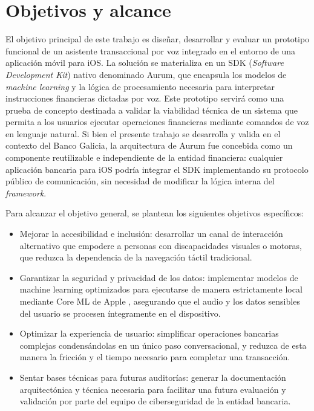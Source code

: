 \section{Objetivos y alcance}


El objetivo principal de este trabajo es diseñar, desarrollar y evaluar un prototipo funcional de un asistente transaccional por voz integrado en el entorno de una aplicación móvil para iOS. La solución se materializa en un SDK (\textit{Software Development Kit}) nativo denominado Aurum, que encapsula los modelos de \textit{machine learning} y la lógica de procesamiento necesaria para interpretar instrucciones financieras dictadas por voz. Este prototipo servirá como una prueba de concepto destinada a validar la viabilidad técnica de un sistema que permita a los usuarios ejecutar operaciones financieras mediante comandos de voz en lenguaje natural. Si bien el presente trabajo se desarrolla y valida en el contexto del Banco Galicia, la arquitectura de Aurum fue concebida como un componente reutilizable e independiente de la entidad financiera: cualquier aplicación bancaria para iOS podría integrar el SDK implementando su protocolo público de comunicación, sin necesidad de modificar la lógica interna del \textit{framework}.


Para alcanzar el objetivo general, se plantean los siguientes objetivos específicos:

\begin{itemize}
\item Mejorar la accesibilidad e inclusión: desarrollar un canal de interacción alternativo que empodere a personas con discapacidades visuales o motoras, que reduzca la dependencia de la navegación táctil tradicional.
\item Garantizar la seguridad y privacidad de los datos: implementar modelos de machine learning optimizados para ejecutarse de manera estrictamente local mediante Core ML de Apple \citep{apple2025coreml}, asegurando que el audio y los datos sensibles del usuario se procesen íntegramente en el dispositivo.
\item Optimizar la experiencia de usuario: simplificar operaciones bancarias complejas condensándolas en un único paso conversacional, y reduzca de esta manera la fricción y el tiempo necesario para completar una transacción.
\item Sentar bases técnicas para futuras auditorías: generar la documentación arquitectónica y técnica necesaria para facilitar una futura evaluación y validación por parte del equipo de ciberseguridad de la entidad bancaria.
\end{itemize}

